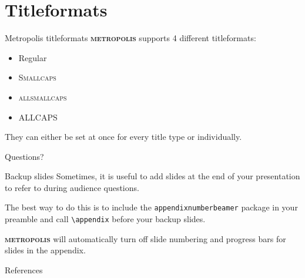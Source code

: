 \documentclass[10pt]{beamer}
\newcommand{\themename}{\textbf{\textsc{metropolis}}\xspace}
\begin{document}
\section{Titleformats}

\begin{frame}{Metropolis titleformats}
	\themename supports 4 different titleformats:
	\begin{itemize}
		\item Regular
		\item \textsc{Smallcaps}
		\item \textsc{allsmallcaps}
		\item ALLCAPS
	\end{itemize}
	They can either be set at once for every title type or individually.
\end{frame}


{
\begin{frame}[standout]
  Questions?
\end{frame}
}

\appendix

\begin{frame}[fragile]{Backup slides}
  Sometimes, it is useful to add slides at the end of your presentation to
  refer to during audience questions.

  The best way to do this is to include the \verb|appendixnumberbeamer|
  package in your preamble and call \verb|\appendix| before your backup slides.

  \themename will automatically turn off slide numbering and progress bars for
  slides in the appendix.
\end{frame}

\begin{frame}[allowframebreaks]{References}

  
  

\end{frame}
\end{document}
